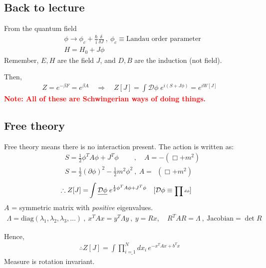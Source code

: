 \documentclass[14pt]{article} %
\begin{document}
\subsection*{Back to lecture}
From the quantum field
\begin{align*}
&\phi \to \phi_c + \frac{\hbar}{i} \frac{\delta}{\delta J} ~,~ \phi_c \equiv \text{Landau order parameter} \\
&H = H_0 + J \phi
\end{align*}
Remember, $E, H$ are the field $J$, and $D, B$ are the induction (not field).

Then,
\begin{align*}
Z = e^{-\beta F} = e^{\beta A} \quad \Rightarrow \quad Z[J] = \int \mathcal{D}\phi \; e^{i(S + J \phi)} = e^{iW[J]}
\end{align*}
\textcolor{red}{\textbf{Note: All of these are Schwingerian ways of doing things.}}

\subsection{Free theory}
Free theory means there is no interaction present. The action is written as:
\begin{align*}
& S = \frac12 \phi^T A \phi + J^T \phi ~\qquad , \quad A = -(\Box + m^2) \\
& S = \frac12 (\partial \phi)^2 - \frac12 m^2 \phi^2 ~,~ A =~~ (\Box + m^2)
\end{align*}
\begin{align*}
\therefore Z[J] = &\int \underline{\mathcal{D}\phi} \; e^{\frac12 \phi^T A \phi + J^T \phi} \quad [ \mathcal{D}\phi \equiv \tiny\text{\(\prod d\phi\)} ]
\end{align*}
$A$ = symmetric matrix with \textit{positive} eigenvalues.
\begin{align*}
\Lambda = \mathrm{diag} \left( \lambda_1, \lambda_2, \lambda_3, \dots \right) ~,~
x^T A x = y^T \Lambda y ~,~
y = R x, \quad R^T A R = \Lambda ~,~ \text{Jacobian} = \det R
\end{align*}

Hence,
\begin{align*}
\therefore Z[J] =  \int \underline{\prod_{i=1}^N dx_i} \, e^{-x^T A x + b^T x}
\end{align*}
Measure is rotation invariant.
\end{document}
